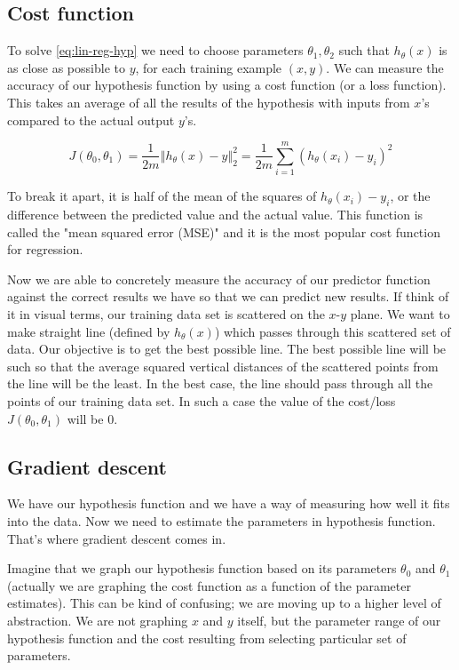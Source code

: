 \documentclass[a4paper,11pt]{report}
\newcommand{\norm}[1]{\left\Vert#1\right\Vert}
\newcommand{\ds}{\displaystyle}
\begin{document}
\subsection*{Cost function}

To solve \eqref{eq:lin-reg-hyp} we need to choose parameters $\theta_1, \theta_2$ such that $h_\theta(x)$ is as close as possible to $y$, for each training example $(x, y)$.
We can measure the accuracy of our hypothesis function by using a cost function (or a loss function).
This takes an average of all the results of the hypothesis with inputs from $x$'s compared to the actual output $y$'s.

\begin{equation}\label{eq:lin-reg-cost}
J(\theta_0, \theta_1) = \dfrac{1}{2m} \ds\norm{h_\theta(x) - y}_2^2  = \dfrac{1}{2m}\ds \sum_{i=1}^m \left(h_\theta(x_{i}) - y_{i}\right)^2
\end{equation}

To break it apart, it is half of the mean of the squares of $h_\theta(x_{i}) - y_{i}$, or the difference between the predicted value and the actual value. This function is called the "mean squared error (MSE)" and it is the most popular cost function for regression.

Now we are able to concretely measure the accuracy of our predictor function against the correct results we have so that we can predict new results.
If think of it in visual terms, our training data set is scattered on the $x$-$y$ plane. We want to make straight line (defined by $h_\theta(x)$) which passes through this scattered set of data. Our objective is to get the best possible line. The best possible line will be such so that the average squared vertical distances of the scattered points from the line will be the least. In the best case, the line should pass through all the points of our training data set. In such a case the value of the cost/loss $J(\theta_0, \theta_1)$ will be 0.

\subsection*{Gradient descent}

We have our hypothesis function and we have a way of measuring how well it fits into the data. Now we need to estimate the parameters in hypothesis function. That's where gradient descent comes in.

Imagine that we graph our hypothesis function based on its parameters $\theta_0$ and $\theta_1$ (actually we are graphing the cost function as a function of the parameter estimates). This can be kind of confusing; we are moving up to a higher level of abstraction. We are not graphing $x$ and $y$ itself, but the parameter range of our hypothesis function and the cost resulting from selecting particular set of parameters.
\end{document}
